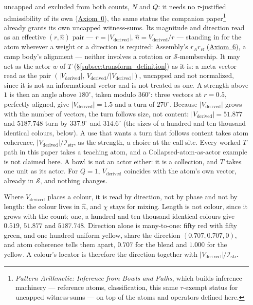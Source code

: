 \documentclass[12pt, a4paper]{article}
\begin{document}
uncapped and excluded from both counts, $N$ and $Q$: it needs no $\tau$-justified
admissibility of its own (\hyperref[subsec:axiom0_admissibility]{Axiom~0}),
the same status the companion paper\footnote{\emph{Pattern
Arithmetic: Inference from Bowls and Paths}, which builds inference
machinery --- reference atoms, classification, this same
$\tau$-exempt status for uncapped witness-sums --- on top of the
atoms and operators defined here.} already grants its own uncapped
witness-sums. Its magnitude and direction read as an effective
$(r,\hat n)$ pair --- $r=\lvert V_{\text{derived}}\rvert$, $\hat n =
V_{\text{derived}}/r$ --- standing in for the atom wherever a weight
or a direction is required: Assembly's $r_Ar_B$
(\hyperref[subsec:axiom_assembly]{Axiom~6}), a camp body's alignment ---
neither involves a rotation or $\mathcal{S}$-membership. It may act
as the actor $w$ of $T$ (\S\ref{subsec:transform_definition}) as it is: a
meta vector read as the pair $(\lvert V_{\text{derived}}\rvert,\,
V_{\text{derived}}/\lvert V_{\text{derived}}\rvert)$, uncapped and not
normalized, since it is not an informational vector and is not treated as
one. A strength above $1$ is then an angle above $180^\circ$, taken modulo
$360^\circ$: three vectors at $r=0.5$, perfectly aligned, give $\lvert
V_{\text{derived}}\rvert=1.5$ and a turn of $270^\circ$. Because $\lvert
V_{\text{derived}}\rvert$ grows with the number of vectors, the turn follows
size, not content: $\lvert V_{\text{derived}}\rvert=51.877$ and $5187.748$
turn by $337.9^\circ$ and $314.6^\circ$ (the sizes of a hundred and ten thousand identical colours, below). A use that wants a turn that
follows content takes atom coherence, $\lvert
V_{\text{derived}}\rvert/\mathcal{I}_{\mathrm{str}}$, as the strength, a
choice at the call site. Every worked $T$ path in this paper takes a
teaching atom, and a Collapsed-atom-as-actor example is not claimed here. A bowl is not an actor either: it is a collection, and $T$ takes one unit as its actor. For $Q=1$,
$V_{\text{derived}}$ coincides with the atom's own vector, already
in $\mathcal{S}$, and nothing changes.

Where $V_{\text{derived}}$ places a colour, it is read by direction, not by
phase and not by length: the colour lives in $\hat n$, and $\chi$ stays for
mixing. Length is not colour, since it grows with the count; one, a hundred
and ten thousand identical colours give $0.519$, $51.877$ and $5187.748$.
Direction alone is many-to-one: fifty red with fifty green, and one hundred
uniform yellow, share the direction $(0.707,0.707,0)$, and atom coherence
tells them apart, $0.707$ for the blend and $1.000$ for the yellow. A
colour's locator is therefore the direction together with $\lvert
V_{\text{derived}}\rvert/\mathcal{I}_{\mathrm{str}}$.
\end{document}
